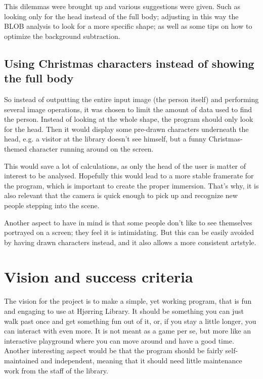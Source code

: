 This dilemmas were brought up and various suggestions were given. Such as looking only for the head instead of the full body; adjusting in this way the BLOB analysis to look for a more specific shape; as well as some tips on how to optimize the background subtraction.


\subsection{Using Christmas characters instead of showing the full body}
So instead of outputting the entire input image (the person itself) and performing several image operations, it was chosen to limit the amount of data used to find the person. Instead of looking at the whole shape, the program should only look for the head. Then it would display some pre-drawn characters underneath the head, e.g. a visitor at the library doesn't see himself, but a funny Christmas-themed character running around on the screen.

This would save a lot of calculations, as only the head of the user is matter of interest to be analysed. Hopefully this would lead to a more stable framerate for the program, which is important to create the proper immersion. That's why, it is also relevant that the camera is quick enough to pick up and recognize new people stepping into the scene.

Another aspect to have in mind is that some people don't like to see themselves portrayed on a screen; they feel it is intimidating. But this can be easily avoided by having drawn characters instead, and it also allows a more consistent artstyle.
  
\section{Vision and success criteria}
The vision for the project is to make a simple, yet working program, that is fun and engaging to use at Hj{\o}rring Library. It should be something you can just walk past once and get something fun out of it, or, if you stay a little longer, you can interact with even more. It is not meant as a game per se, but more like an interactive playground where you can move around and have a good time. Another interesting aspect would be that the program should be fairly self-maintained and independent, meaning that it should need little maintenance work from the staff of the library.

